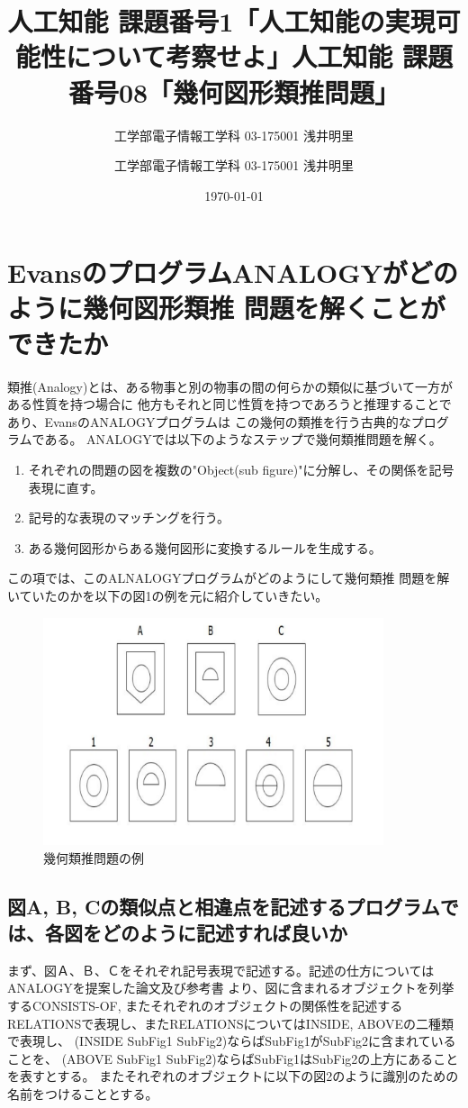 \documentclass[uplatex]{jsarticle}
\title{人工知能 課題番号1「人工知能の実現可能性について考察せよ」}
\author{工学部電子情報工学科 03-175001 浅井明里}
\title{人工知能 課題番号08「幾何図形類推問題」}
\author{工学部電子情報工学科 03-175001 浅井明里}
\date{\today}
\makeatletter
\def\maketitle{%
  \null
  \thispagestyle{empty}%
  \vfill
  \begin{center}\leavevmode
    \normalfont
    {\LARGE \@title\par}%
    \vskip 1cm
    {\Large \@author\par}%
    \vskip 1cm
    {\Large \@date\par}%
  \end{center}%
  \vfill
  \null
  \@thanks%
  \cleardoublepage
  }
\makeatother
\begin{document}
\maketitle

\section{EvansのプログラムANALOGYがどのように幾何図形類推
問題を解くことができたか}
類推(Analogy)とは、ある物事と別の物事の間の何らかの類似に基づいて一方がある性質を持つ場合に
他方もそれと同じ性質を持つであろうと推理することであり、EvansのANALOGYプログラムは
この幾何の類推を行う古典的なプログラムである。
ANALOGYでは以下のようなステップで幾何類推問題を解く。
\begin{enumerate}
  \item それぞれの問題の図を複数の"Object(sub figure)"に分解し、その関係を記号表現に直す。
  \item 記号的な表現のマッチングを行う。
  \item ある幾何図形からある幾何図形に変換するルールを生成する。
\end{enumerate}

この項では、このALNALOGYプログラムがどのようにして幾何類推
問題を解いていたのかを以下の図1の例を元に紹介していきたい。
\begin{figure}
  \begin{center}
    \includegraphics[width=10cm]{img/problem.png}
    \caption{幾何類推問題の例}
  \end{center}
\end{figure}

\subsection{図A, B, Cの類似点と相違点を記述するプログラムでは、各図をどのように記述すれば良いか}
まず、図Ａ、Ｂ、Ｃをそれぞれ記号表現で記述する。記述の仕方についてはANALOGYを提案した論文及び参考書
より、図に含まれるオブジェクトを列挙するCONSISTS-OF, またそれぞれのオブジェクトの関係性を記述する
RELATIONSで表現し、またRELATIONSについてはINSIDE, ABOVEの二種類で表現し、
(INSIDE SubFig1 SubFig2)ならばSubFig1がSubFig2に含まれていることを、
(ABOVE SubFig1 SubFig2)ならばSubFig1はSubFig2の上方にあることを表すとする。
またそれぞれのオブジェクトに以下の図2のように識別のための名前をつけることとする。
\end{document}
